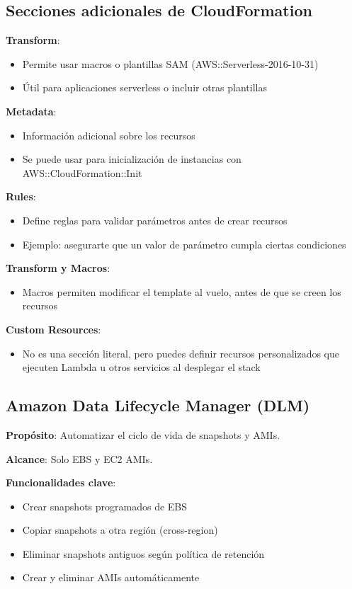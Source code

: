 \documentclass[12pt,a4paper]{report}
\begin{document}
\subsection{Secciones adicionales de CloudFormation}

\textbf{Transform}:
\begin{itemize}
    \item Permite usar macros o plantillas SAM (AWS::Serverless-2016-10-31)
    \item Útil para aplicaciones serverless o incluir otras plantillas
\end{itemize}

\textbf{Metadata}:
\begin{itemize}
    \item Información adicional sobre los recursos
    \item Se puede usar para inicialización de instancias con AWS::CloudFormation::Init
\end{itemize}

\textbf{Rules}:
\begin{itemize}
    \item Define reglas para validar parámetros antes de crear recursos
    \item Ejemplo: asegurarte que un valor de parámetro cumpla ciertas condiciones
\end{itemize}

\textbf{Transform y Macros}:
\begin{itemize}
    \item Macros permiten modificar el template al vuelo, antes de que se creen los recursos
\end{itemize}

\textbf{Custom Resources}:
\begin{itemize}
    \item No es una sección literal, pero puedes definir recursos personalizados que ejecuten Lambda u otros servicios al desplegar el stack
\end{itemize}

\subsection{Amazon Data Lifecycle Manager (DLM)}

\textbf{Propósito}: Automatizar el ciclo de vida de snapshots y AMIs.

\textbf{Alcance}: Solo EBS y EC2 AMIs.

\textbf{Funcionalidades clave}:
\begin{itemize}
    \item Crear snapshots programados de EBS
    \item Copiar snapshots a otra región (cross-region)
    \item Eliminar snapshots antiguos según política de retención
    \item Crear y eliminar AMIs automáticamente
\end{itemize}
\end{document}
